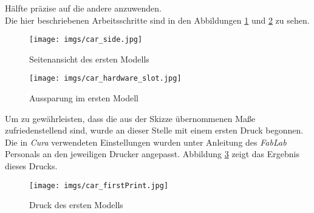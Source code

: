 \documentclass[.../Dokumentation.tex]{subfiles}
\begin{document}
Hälfte präzise auf die andere anzuwenden.\\
Die hier beschriebenen Arbeitsschritte sind in den Abbildungen 
\ref{fig-car-side} und \ref{fig-car-slot} zu sehen.
\begin{figure}[H]
\begin{center}
    \texttt{[image: imgs/car\_side.jpg]}
    \caption{Seitenansicht des ersten Modells}
    \label{fig-car-side}
\end{center}
\end{figure}
\begin{figure}[H]
\begin{center}
    \texttt{[image: imgs/car\_hardware\_slot.jpg]}
    \caption{Aussparung im ersten Modell}
    \label{fig-car-slot}
\end{center}
\end{figure}
\noindent
Um zu gewährleisten, dass die aus der Skizze übernommenen Maße 
zufriedenstellend sind, wurde an dieser Stelle mit einem ersten Druck begonnen.
Die in \textit{Cura} verwendeten Einstellungen wurden unter Anleitung 
des \textit{FabLab} Personals an den jeweiligen Drucker angepasst. 
Abbildung \ref{fig-car-firstPrint} zeigt das Ergebnis dieses Drucks.
\begin{figure}[H]
    \begin{center}
        \texttt{[image: imgs/car\_firstPrint.jpg]}
        \caption{Druck des ersten Modells}
        \label{fig-car-firstPrint}
    \end{center}
    \end{figure}
\end{document}
